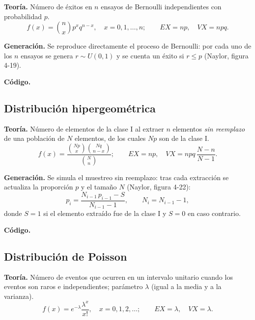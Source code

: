\documentclass[11pt]{article}
\begin{document}
\textbf{Teor\'ia.} N\'umero de \'exitos en $n$ ensayos de Bernoulli
independientes con probabilidad $p$.
\begin{equation}
f(x) = \binom{n}{x} p^x q^{n-x}, \quad x = 0,1,\dots,n;
\qquad EX = np, \quad VX = npq.
\end{equation}

\textbf{Generaci\'on.} Se reproduce directamente el proceso de Bernoulli:
por cada uno de los $n$ ensayos se genera $r \sim U(0,1)$ y se cuenta un
\'exito si $r \le p$ (Naylor, figura 4-19).

\textbf{C\'odigo.}


\subsection{Distribuci\'on hipergeom\'etrica}

\textbf{Teor\'ia.} N\'umero de elementos de la clase I al extraer $n$
elementos \emph{sin reemplazo} de una poblaci\'on de $N$ elementos, de los
cuales $Np$ son de la clase I.
\begin{equation}
f(x) = \frac{\binom{Np}{x}\binom{Nq}{n-x}}{\binom{N}{n}};
\qquad EX = np, \quad VX = npq\,\frac{N-n}{N-1}.
\end{equation}

\textbf{Generaci\'on.} Se simula el muestreo sin reemplazo: tras cada
extracci\'on se actualiza la proporci\'on $p$ y el tama\~no $N$ (Naylor,
figura 4-22):
\begin{equation}
p_i = \frac{N_{i-1}\,p_{i-1} - S}{N_{i-1} - 1}, \qquad N_i = N_{i-1} - 1,
\end{equation}
donde $S=1$ si el elemento extra\'ido fue de la clase I y $S=0$ en caso
contrario.

\textbf{C\'odigo.}


\subsection{Distribuci\'on de Poisson}

\textbf{Teor\'ia.} N\'umero de eventos que ocurren en un intervalo unitario
cuando los eventos son raros e independientes; par\'ametro $\lambda$ (igual
a la media y a la varianza).
\begin{equation}
f(x) = e^{-\lambda}\frac{\lambda^x}{x!}, \quad x = 0,1,2,\dots;
\qquad EX = \lambda, \quad VX = \lambda.
\end{equation}
\end{document}
